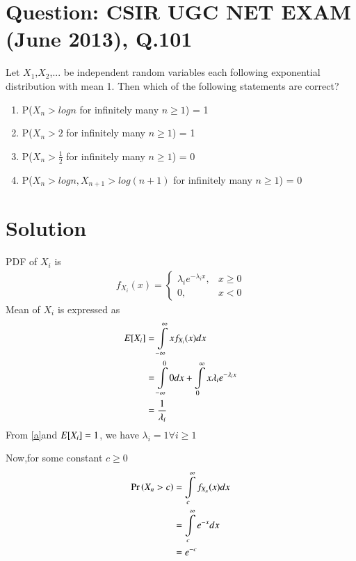 \documentclass[journal,12pt,twocolumn]{IEEEtran}
\begin{document}
\section*{Question: CSIR UGC NET EXAM (June 2013), Q.101}
Let $X_1$,$X_2$,... be independent random variables each following exponential distribution with mean 1. Then which of the following statements are correct?
\begin{enumerate}
    \item P($X_n > log n$ for infinitely many $n \geq 1$) = 1
    \item P($X_n > 2$ for infinitely many $n \geq 1$) = 1
    \item P($X_n > \frac{1}{2}$ for infinitely many $n \geq 1$) = 0
    \item P($X_n > log n, X_{n+1}>log(n+1)$ for infinitely many $n \geq 1$) = 0
\end{enumerate}
\section*{Solution}
\newcommand{\Integral}[2]{\ensuremath{\int\limits_{#1}^{#2}}}

PDF of $X_i$ is
\begin{align}
    f_{X_i}(x)=\begin{cases}\lambda_i e^{-\lambda_i x}, &x\geq 0\\
                0, &x<0\nonumber
    \end{cases}    
\end{align} 
Mean of $X_i$ is expressed as
\begin{align}
    \mean{X_i}&=\Integral{-\infty}{\infty}x f_{X_i}(x) dx\nonumber\\
              &=\Integral{-\infty}{0}0 dx + \Integral{0}{\infty}x \lambda_i e^{-\lambda_i x}\nonumber\\
              &=\frac{1}{\lambda_i}\label{a}
\end{align}
From \eqref{a}and $E[ X_i ]=1$, we have $\lambda_i=1 \forall  i \geq1$


Now,for some constant $c\geq0$
\begin{align}
    \pr{X_n>c}&=\Integral{c}{\infty}f_{X_n}(x)dx\nonumber\\
              &=\Integral{c}{\infty}e^{-x}dx\nonumber\\
              &=e^{-c}\label{b}
\end{align}
\end{document}

